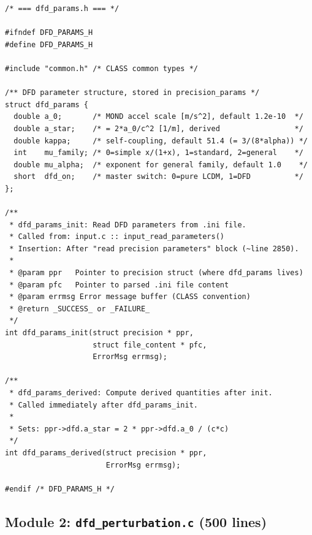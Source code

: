 \documentclass[11pt]{article}
\theoremstyle{definition}
\theoremstyle{remark}
\begin{document}
\begin{lstlisting}[caption={Module 1: Complete function signatures}]
/* === dfd_params.h === */

#ifndef DFD_PARAMS_H
#define DFD_PARAMS_H

#include "common.h" /* CLASS common types */

/** DFD parameter structure, stored in precision_params */
struct dfd_params {
  double a_0;       /* MOND accel scale [m/s^2], default 1.2e-10  */
  double a_star;    /* = 2*a_0/c^2 [1/m], derived                 */
  double kappa;     /* self-coupling, default 51.4 (= 3/(8*alpha)) */
  int    mu_family; /* 0=simple x/(1+x), 1=standard, 2=general    */
  double mu_alpha;  /* exponent for general family, default 1.0    */
  short  dfd_on;    /* master switch: 0=pure LCDM, 1=DFD          */
};

/**
 * dfd_params_init: Read DFD parameters from .ini file.
 * Called from: input.c :: input_read_parameters()
 * Insertion: After "read precision parameters" block (~line 2850).
 *
 * @param ppr   Pointer to precision struct (where dfd_params lives)
 * @param pfc   Pointer to parsed .ini file content
 * @param errmsg Error message buffer (CLASS convention)
 * @return _SUCCESS_ or _FAILURE_
 */
int dfd_params_init(struct precision * ppr,
                    struct file_content * pfc,
                    ErrorMsg errmsg);

/**
 * dfd_params_derived: Compute derived quantities after init.
 * Called immediately after dfd_params_init.
 *
 * Sets: ppr->dfd.a_star = 2 * ppr->dfd.a_0 / (c*c)
 */
int dfd_params_derived(struct precision * ppr,
                       ErrorMsg errmsg);

#endif /* DFD_PARAMS_H */
\end{lstlisting}

\subsection{Module 2: \texttt{dfd\_perturbation.c} (500 lines)}
\end{document}

